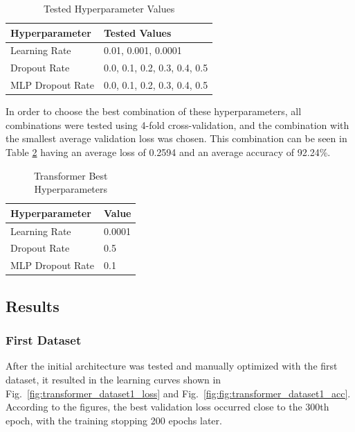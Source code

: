 \begin{table}[H]
    \centering
    \caption{Tested Hyperparameter Values}
    \label{table:transformer_hyperparameters}
    \begin{tabular}{|l|l|}
        \hline
        Hyperparameter & Tested Values \\
        \hline
        Learning Rate & 0.01, 0.001, 0.0001 \\
        \hline
        Dropout Rate & 0.0, 0.1, 0.2, 0.3, 0.4, 0.5 \\
        \hline
        MLP Dropout Rate & 0.0, 0.1, 0.2, 0.3, 0.4, 0.5 \\
        \hline
    \end{tabular}
\end{table}

In order to choose the best combination of these hyperparameters, all combinations were
tested using 4-fold cross-validation, and the combination with the smallest average validation loss was chosen. This combination can be seen in Table \ref{table:transformer_best_hyperparameters}
having an average loss of 0.2594 and an average accuracy of 92.24\%.

\begin{table}[H]
    \centering
    \caption{Transformer Best Hyperparameters}
    \label{table:transformer_best_hyperparameters}
    \begin{tabular}{|l|l|}
        \hline
        Hyperparameter & Value \\
        \hline
        Learning Rate & 0.0001 \\
        \hline
        Dropout Rate & 0.5 \\
        \hline
        MLP Dropout Rate & 0.1 \\
        \hline
    \end{tabular}
\end{table}

\subsection{Results}

\subsubsection{First Dataset}

After the initial architecture was tested and manually optimized with the first dataset, it resulted in the learning curves shown in Fig.~\ref{fig:transformer_dataset1_loss} and Fig.~\ref{fig:fig:transformer_dataset1_acc}. According to the figures, the best validation loss occurred close to the 300th epoch, with the training stopping 200 epochs later.

